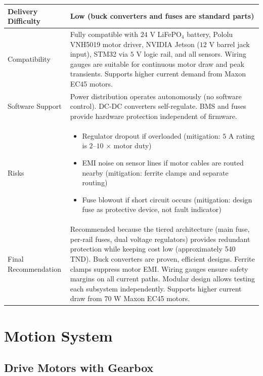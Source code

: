 \documentclass[12pt,a4paper]{article}
\begin{document}
\begin{longtable}{|p{4cm}|p{10cm}|}
Delivery Difficulty &
Low (buck converters and fuses are standard parts) \\
\hline

Compatibility &
Fully compatible with $24$ V LiFePO$_4$ battery, Pololu VNH5019 motor driver, NVIDIA Jetson ($12$ V barrel jack input), STM32 via $5$ V logic rail, and all sensors. Wiring gauges are suitable for continuous motor draw and peak transients. Supports higher current demand from Maxon EC45 motors. \\
\hline

Software Support &
Power distribution operates autonomously (no software control). DC-DC converters self-regulate. BMS and fuses provide hardware protection independent of firmware. \\
\hline

Risks &
\begin{itemize}
\item Regulator dropout if overloaded (mitigation: $5$ A rating is $2$--$10$ $\times$ motor duty)
\item EMI noise on sensor lines if motor cables are routed nearby (mitigation: ferrite clamps and separate routing)
\item Fuse blowout if short circuit occurs (mitigation: design fuse as protective device, not fault indicator)
\end{itemize}
\\
\hline

Final Recommendation &
Recommended because the tiered architecture (main fuse, per-rail fuses, dual voltage regulators) provides redundant protection while keeping cost low (approximately 540 TND). Buck converters are proven, efficient designs. Ferrite clamps suppress motor EMI. Wiring gauges ensure safety margins on all current paths. Modular design allows testing each subsystem independently. Supports higher current draw from $70$ W Maxon EC45 motors. \\
\hline

\end{longtable}

\newpage
\section{Motion System}

\subsection{Drive Motors with Gearbox}
\end{document}
